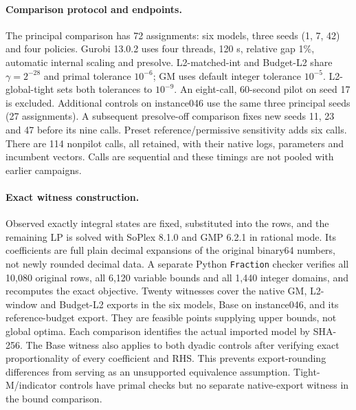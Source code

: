 \documentclass[11pt]{article}
\begin{document}
\paragraph{Comparison protocol and endpoints.}
The principal comparison has 72 assignments: six models, three seeds (1, 7, 42)
and four policies. Gurobi 13.0.2 uses four threads, 120 s, relative gap 1\%,
automatic internal scaling and presolve. L2-matched-int and Budget-L2 share
$\gamma=2^{-28}$ and primal tolerance $10^{-6}$; GM uses default integer
tolerance $10^{-5}$. L2-global-tight sets both tolerances to $10^{-9}$.
An eight-call, 60-second pilot on seed 17 is excluded. Additional controls on
instance046 use the same three principal seeds (27 assignments). A subsequent
presolve-off comparison fixes new seeds 11, 23 and 47 before its nine calls.
Preset reference/permissive sensitivity adds six calls. There are 114 nonpilot
calls, all retained, with their native logs, parameters and incumbent vectors.
Calls are sequential and these timings are not pooled with earlier campaigns.

\begin{table}[tb]
\centering\small
\caption{Activation follow-up on six models and three seeds. All 18 calls per
policy report completion. The Budgets column counts integer-rounded points passing
exact original-unit checks on all audited physical rows and activations. $B>U$ counts
reported bounds above an exact feasible objective of the same imported export,
allowing the larger of $10^{-6}$ objective units and eight bound ulps for display
rounding. Gap flags count cases satisfying $U<C-0.01|C|$, incompatible with the requested
completion criterion. Neither an unflagged bound nor budget compliance certifies
global optimality. Work is the geometric mean over all assigned calls, including
flagged completions; it must be interpreted with those flags.}
\label{tab:activation-bank}

\end{table}

\paragraph{Exact witness construction.}
Observed exactly integral states are fixed, substituted into the rows, and the
remaining LP is solved with SoPlex 8.1.0 and GMP 6.2.1 in rational mode.
Its coefficients are full plain decimal expansions of the original binary64
numbers, not newly rounded decimal data. A separate Python \texttt{Fraction}
checker verifies all 10,080 original rows, all 6,120 variable bounds and all
1,440 integer domains, and recomputes the exact objective. Twenty witnesses
cover the native GM, L2-window and Budget-L2 exports in the six models,
Base on instance046, and its reference-budget export. They are feasible
points supplying upper bounds, not global optima. Each comparison identifies
the actual imported model by SHA-256. The Base witness also applies to both
dyadic controls after verifying exact proportionality of every coefficient
and RHS. This prevents export-rounding differences from serving as an
unsupported equivalence assumption. Tight-M/indicator controls have primal
checks but no separate native-export witness in the bound comparison.
\end{document}

